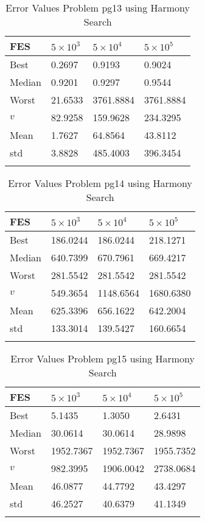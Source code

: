 \documentclass[10pt, a4paper]{book}
\begin{document}
\begin{center}
\begin{longtable}{l l l l}
FES & $5 \times 10^{3}$ & $5 \times 10^{4}$ & $5 \times 10^{5}$ \\
\hline
Best & 0.2697 & 0.9193 & 0.9024 \\
Median & 0.9201 & 0.9297 & 0.9544 \\
Worst & 21.6533 & 3761.8884 & 3761.8884 \\
$v$ & 82.9258 & 159.9628 & 234.3295 \\
Mean & 1.7627 & 64.8564 & 43.8112 \\
std & 3.8828 & 485.4003 & 396.3454 \\
\caption{ Error Values Problem pg13 using Harmony Search }
\end{longtable}
\end{center}

\begin{center}
\begin{longtable}{l l l l}
FES & $5 \times 10^{3}$ & $5 \times 10^{4}$ & $5 \times 10^{5}$ \\
\hline
Best & 186.0244 & 186.0244 & 218.1271 \\
Median & 640.7399 & 670.7961 & 669.4217 \\
Worst & 281.5542 & 281.5542 & 281.5542 \\
$v$ & 549.3654 & 1148.6564 & 1680.6380 \\
Mean & 625.3396 & 656.1622 & 642.2004 \\
std & 133.3014 & 139.5427 & 160.6654 \\
\caption{ Error Values Problem pg14 using Harmony Search }
\end{longtable}
\end{center}

\begin{center}
\begin{longtable}{l l l l}
FES & $5 \times 10^{3}$ & $5 \times 10^{4}$ & $5 \times 10^{5}$ \\
\hline
Best & 5.1435 & 1.3050 & 2.6431 \\
Median & 30.0614 & 30.0614 & 28.9898 \\
Worst & 1952.7367 & 1952.7367 & 1955.7352 \\
$v$ & 982.3995 & 1906.0042 & 2738.0684 \\
Mean & 46.0877 & 44.7792 & 43.4297 \\
std & 46.2527 & 40.6379 & 41.1349 \\
\caption{ Error Values Problem pg15 using Harmony Search }
\end{longtable}
\end{center}
\end{document}
